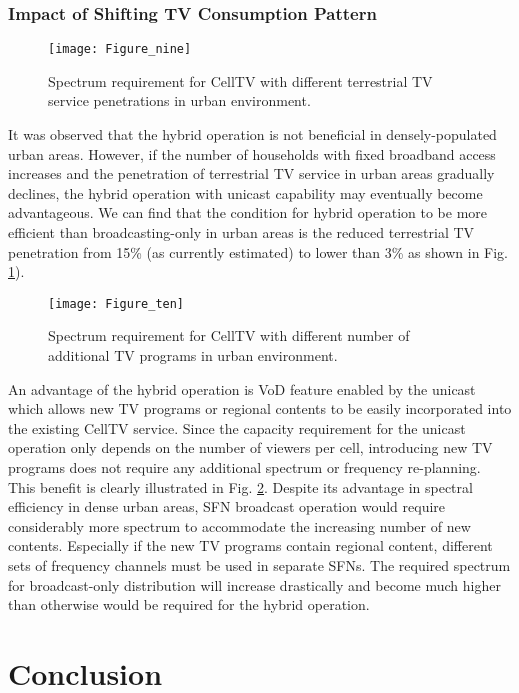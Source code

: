 \documentclass[journal]{IEEEtran}
\begin{document}
\subsubsection{\textbf{Impact of Shifting TV Consumption Pattern}}
 \begin{figure}[t]
  \centering
  \texttt{[image: Figure\_nine]}\\
  \caption{Spectrum requirement for CellTV with different terrestrial TV service penetrations in urban environment.}\label{fig:penetration}
\end{figure}	
It was observed that the hybrid operation is not beneficial in densely-populated urban areas. However, if the number of households with fixed broadband access increases and the penetration of terrestrial TV service in urban areas gradually declines, the hybrid operation with unicast capability may eventually become advantageous. We can find that the condition for hybrid operation to be more efficient than broadcasting-only in urban areas is the reduced terrestrial TV penetration from 15\% (as currently estimated) to lower than 3\% as shown in Fig. \ref{fig:penetration}).
\begin{figure}[t]
  \centering
  \texttt{[image: Figure\_ten]}\\
  \caption{Spectrum requirement for CellTV with different number of additional TV programs in urban environment.}\label{fig:Add_ch}
\end{figure}

An advantage of the hybrid operation is VoD feature enabled by the unicast which allows new TV programs or regional contents to be easily incorporated into the existing CellTV service. Since the capacity requirement for the unicast operation only depends on the number of viewers per cell, introducing new TV programs does not require any additional spectrum or frequency re-planning. This benefit is clearly illustrated in Fig. \ref{fig:Add_ch}. Despite its advantage in spectral efficiency in dense urban areas, SFN broadcast operation would require considerably more spectrum to accommodate the increasing number of new contents. Especially if the new TV programs contain regional content, different sets of frequency channels must be used in separate SFNs. The required spectrum for broadcast-only distribution will increase drastically and become much higher than otherwise would be required for the hybrid operation.


\section{Conclusion}
\label{sec:concl}
\end{document}
